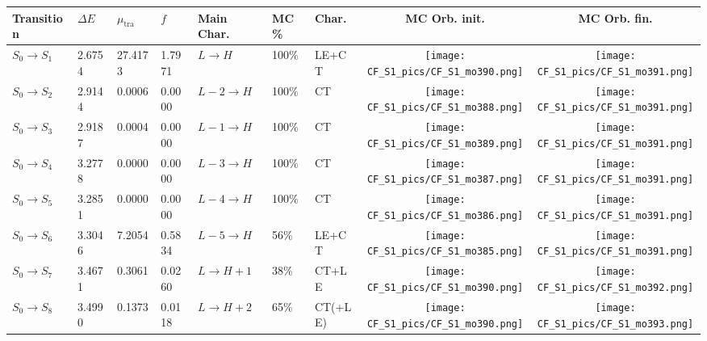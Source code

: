 \documentclass[9pt]{scrartcl}
\begin{document}
\begin{tabular}{l|lll|lllcc}
Transition & $\Delta E$ & $\mu_\mathrm{tra}$ & $f$ & Main Char. & MC \% & Char. & MC Orb. init. & MC Orb. fin.\\\hline
$S_0 \rightarrow S_{1} $       & 2.6754     & 27.4173    & 1.7971     & $L \rightarrow H$              & 100\%      & LE+CT      & \texttt{[image: CF\_S1\_pics/CF\_S1\_mo390.png]} & \texttt{[image: CF\_S1\_pics/CF\_S1\_mo391.png]}\\\hline
$S_0 \rightarrow S_{2} $       & 2.9144     & 0.0006     & 0.0000     & $L-2 \rightarrow H$            & 100\%      & CT         & \texttt{[image: CF\_S1\_pics/CF\_S1\_mo388.png]} & \texttt{[image: CF\_S1\_pics/CF\_S1\_mo391.png]}\\\hline
$S_0 \rightarrow S_{3} $       & 2.9187     & 0.0004     & 0.0000     & $L-1 \rightarrow H$            & 100\%      & CT         & \texttt{[image: CF\_S1\_pics/CF\_S1\_mo389.png]} & \texttt{[image: CF\_S1\_pics/CF\_S1\_mo391.png]}\\\hline
$S_0 \rightarrow S_{4} $       & 3.2778     & 0.0000     & 0.0000     & $L-3 \rightarrow H$            & 100\%      & CT         & \texttt{[image: CF\_S1\_pics/CF\_S1\_mo387.png]} & \texttt{[image: CF\_S1\_pics/CF\_S1\_mo391.png]}\\\hline
$S_0 \rightarrow S_{5} $       & 3.2851     & 0.0000     & 0.0000     & $L-4 \rightarrow H$            & 100\%      & CT         & \texttt{[image: CF\_S1\_pics/CF\_S1\_mo386.png]} & \texttt{[image: CF\_S1\_pics/CF\_S1\_mo391.png]}\\\hline
$S_0 \rightarrow S_{6} $       & 3.3046     & 7.2054     & 0.5834     & $L-5 \rightarrow H$            & 56\%       & LE+CT      & \texttt{[image: CF\_S1\_pics/CF\_S1\_mo385.png]} & \texttt{[image: CF\_S1\_pics/CF\_S1\_mo391.png]}\\\hline
$S_0 \rightarrow S_{7} $       & 3.4671     & 0.3061     & 0.0260     & $L \rightarrow H+1$            & 38\%       & CT+LE      & \texttt{[image: CF\_S1\_pics/CF\_S1\_mo390.png]} & \texttt{[image: CF\_S1\_pics/CF\_S1\_mo392.png]}\\\hline
$S_0 \rightarrow S_{8} $       & 3.4990     & 0.1373     & 0.0118     & $L \rightarrow H+2$            & 65\%       & CT(+LE)    & \texttt{[image: CF\_S1\_pics/CF\_S1\_mo390.png]} & \texttt{[image: CF\_S1\_pics/CF\_S1\_mo393.png]}\\\hline

\end{tabular}
\end{document}
